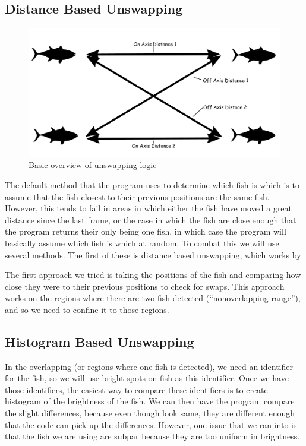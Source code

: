 \documentclass{article}
\begin{document}
\subsection{Distance Based Unswapping}
\begin{figure}[H]
	\centering
	\includegraphics[width=.75\linewidth]{fish2}
	\caption{Basic overview of unswapping logic}
\end{figure}

The default method that the program uses to determine which fish is which is to assume that the fish closest to their previous positions are the same fish. However, this tends to fail in areas in which either the fish have moved a great distance since the last frame, or the case in which the fish are close enough that the program returns their only being one fish, in which case the program will basically assume which fish is which at random. To combat this we will use several methods. The first of these is distance based unswapping, which works by 

The first approach we tried is taking the positions of the fish and comparing how close they were to their previous positions to check for swaps. This approach works on the regions where there are two fish detected (``nonoverlapping range''), and so we need to confine it to those regions. 

\subsection{Histogram Based Unswapping}
In the overlapping (or regions where one fish is detected), we need an identifier for the fish, so we will use bright spots on fish as this identifier. Once we have those identifiers, the easiest way to compare these identifiers is to create histogram of the brightness of the fish. We can then have the program compare the slight differences, because even though look same, they are different enough that the code can pick up the differences. However, one issue that we ran into is that the fish we are using are subpar because they are too uniform in brightness.
\end{document}
